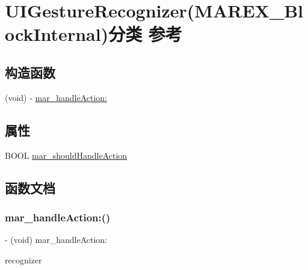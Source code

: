 \hypertarget{category_u_i_gesture_recognizer_07_m_a_r_e_x___block_internal_08}{}\section{U\+I\+Gesture\+Recognizer(M\+A\+R\+E\+X\+\_\+\+Block\+Internal)分类 参考}
\label{category_u_i_gesture_recognizer_07_m_a_r_e_x___block_internal_08}
\subsection*{构造函数}
\begin{DoxyCompactItemize}
\item 
(void) -\/ \hyperlink{category_u_i_gesture_recognizer_07_m_a_r_e_x___block_internal_08_a8b4d2715b86e9a05e50c58be75df21f9}{mar\+\_\+handle\+Action\+:}
\end{DoxyCompactItemize}
\subsection*{属性}
\begin{DoxyCompactItemize}
\item 
B\+O\+OL \hyperlink{category_u_i_gesture_recognizer_07_m_a_r_e_x___block_internal_08_acab06d992f815c504f49b8631ecdfe5a}{mar\+\_\+should\+Handle\+Action}
\end{DoxyCompactItemize}


\subsection{函数文档}
\mbox{\label{category_u_i_gesture_recognizer_07_m_a_r_e_x___block_internal_08_a8b4d2715b86e9a05e50c58be75df21f9}} 
\subsubsection{\texorpdfstring{mar\+\_\+handle\+Action\+:()}{mar\_handleAction:()}}
{\footnotesize\ttfamily -\/ (void) mar\+\_\+handle\+Action\+: \begin{DoxyParamCaption}\item[{(U\+I\+Gesture\+Recognizer $\ast$)}]{recognizer }\end{DoxyParamCaption}}



